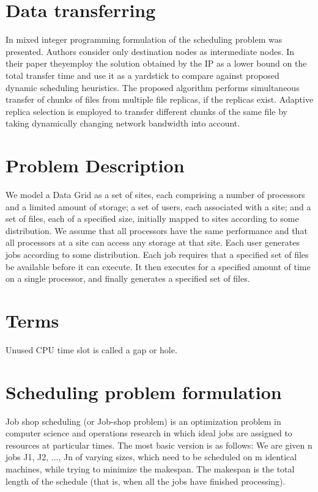 \documentclass[a4paper,10pt]{article}
\begin{document}
\section{Data transferring}
In \cite{Globus: data} mixed integer programming formulation of the scheduling problem was presented.  Authors consider only destination nodes as intermediate nodes. In their paper theyemploy the solution obtained by the IP as a lower bound on the total transfer time and use it as a yardstick to compare against proposed dynamic scheduling heuristics.
The proposed algorithm performs simultaneous transfer of chunks of files from multiple file replicas, if the replicas exist. Adaptive replica selection is employed to transfer different chunks of the same file by taking dynamically changing network bandwidth into account. \cite{Globus: data}


\section{Problem Description}
We model a Data Grid as a set of sites, each comprising a number of processors and a limited
amount of storage; a set of users, each associated with a site; and a set of files, each of a specified size, initially mapped to sites according to some distribution. We assume that all processors have the same performance and that all processors at a site can access any storage at
that site. Each user generates jobs according to some distribution. Each job requires that a specified set of files be available before it can execute. It then executes for a specified amount of time on a single processor, and finally generates a specified set of files.\cite{Globus: scheduler}

\section{Terms}
Unused CPU time slot is called a gap or hole.

\section{Scheduling problem formulation}
Job shop scheduling (or Job-shop problem) is an optimization problem in computer science and operations research in which ideal jobs are assigned to resources at particular times. The most basic version is as follows:
We are given n jobs J1, J2, ..., Jn of varying sizes, which need to be scheduled on m identical machines, while trying to minimize the makespan. The makespan is the total length of the schedule (that is, when all the jobs have finished processing). 
\end{document}
